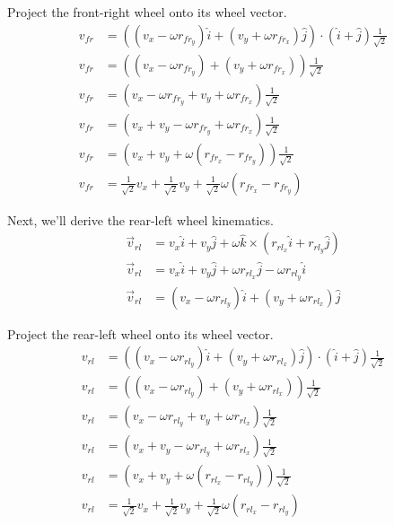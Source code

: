 Project the front-right wheel onto its wheel vector.
\begin{align}
  v_{fr} &= ((v_x - \omega r_{fr_y}) \hat{i} + (v_y + \omega r_{fr_x}) \hat{j})
    \cdot (\hat{i} + \hat{j}) \frac{1}{\sqrt{2}} \nonumber \\
  v_{fr} &= ((v_x - \omega r_{fr_y}) + (v_y + \omega r_{fr_x}))
    \frac{1}{\sqrt{2}} \nonumber \\
  v_{fr} &= (v_x - \omega r_{fr_y} + v_y + \omega r_{fr_x})
    \frac{1}{\sqrt{2}} \nonumber \\
  v_{fr} &= (v_x + v_y - \omega r_{fr_y} + \omega r_{fr_x})
    \frac{1}{\sqrt{2}} \nonumber \\
  v_{fr} &= (v_x + v_y + \omega (r_{fr_x} - r_{fr_y}))
    \frac{1}{\sqrt{2}} \nonumber \\
  v_{fr} &= \frac{1}{\sqrt{2}} v_x + \frac{1}{\sqrt{2}} v_y +
    \frac{1}{\sqrt{2}} \omega (r_{fr_x} - r_{fr_y})
\end{align}

Next, we'll derive the rear-left wheel kinematics.
\begin{align*}
  \vec{v}_{rl} &= v_x \hat{i} + v_y \hat{j} +
    \omega \hat{k} \times (r_{rl_x} \hat{i} + r_{rl_y} \hat{j}) \\
  \vec{v}_{rl} &= v_x \hat{i} + v_y \hat{j} +
    \omega r_{rl_x} \hat{j} - \omega r_{rl_y} \hat{i} \\
  \vec{v}_{rl} &= (v_x - \omega r_{rl_y}) \hat{i} +
    (v_y + \omega r_{rl_x}) \hat{j}
\end{align*}

Project the rear-left wheel onto its wheel vector.
\begin{align}
  v_{rl} &= ((v_x - \omega r_{rl_y}) \hat{i} + (v_y + \omega r_{rl_x}) \hat{j})
    \cdot (\hat{i} + \hat{j}) \frac{1}{\sqrt{2}} \nonumber \\
  v_{rl} &= ((v_x - \omega r_{rl_y}) + (v_y + \omega r_{rl_x}))
    \frac{1}{\sqrt{2}} \nonumber \\
  v_{rl} &= (v_x - \omega r_{rl_y} + v_y + \omega r_{rl_x})
    \frac{1}{\sqrt{2}} \nonumber \\
  v_{rl} &= (v_x + v_y - \omega r_{rl_y} + \omega r_{rl_x})
    \frac{1}{\sqrt{2}} \nonumber \\
  v_{rl} &= (v_x + v_y + \omega (r_{rl_x} - r_{rl_y}))
    \frac{1}{\sqrt{2}} \nonumber \\
  v_{rl} &= \frac{1}{\sqrt{2}} v_x + \frac{1}{\sqrt{2}} v_y +
    \frac{1}{\sqrt{2}} \omega (r_{rl_x} - r_{rl_y})
\end{align}

